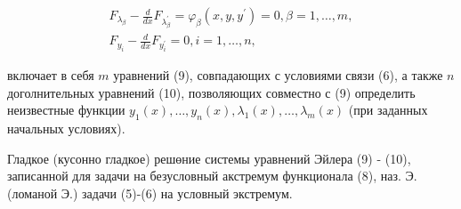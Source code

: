 \documentclass[10pt]{article}
\begin{document}
\[

\begin{gathered}

F_{\lambda_{\beta}}-\frac{d}{d x} F_{\lambda_{\beta}^{\prime}}=\varphi_{\beta}\left(x, y, y^{\prime}\right)=0, \beta=1, \ldots, m, \\

F_{y_{i}}-\frac{d}{d x} F_{y_{i}^{\prime}}=0, i=1, \ldots, n,

\end{gathered}

\]



включает в себя $m$ уравнений (9), совпадающих с условиями связи (6), а также $n$ доголнительных уравнений (10), позволяющих совместно с (9) определить неизвестные функции $y_{1}(x), \ldots, y_{n}(x), \lambda_{1}(x), \ldots, \lambda_{m}(x)$ (при заданных начальных условиях).



Гладкое (кусонно гладкое) решөние системы уравнений Эйлера (9) - (10), записанной для задачи на безусловный акстремум функционала (8), наз. Э. (ломаной Э.) задачи (5)-(6) на условный экстремум.
\end{document}
